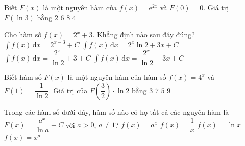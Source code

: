 \begin{ex}%
	 Biết $F(x)$ là một nguyên hàm của $f(x)=\mathrm{e}^{2x}$ và $F(0)=0$. Giá trị $F(\ln 3)$ bằng
	 \choice
		{$2$} 
		 {$6$}
		 {$8$}
		{\True $4$} 
\end{ex}

\begin{ex}%
	Cho hàm số $f(x)=2^x+3$. Khẳng  định nào sau đây đúng?
	\choice 
		 {$\displaystyle\int f(x)\mathrm{\,d}x=2^{x-3}+C$}
		{$\displaystyle\int f(x)\mathrm{\,d}x=2^x \ln  2+3x+C$}
		 {$\displaystyle\int f(x)\mathrm{\,d}x=\dfrac{2^x}{\ln 2}+3+C$}
		{\True $\displaystyle\int  f(x)\mathrm{\,d}x=\dfrac{2^x}{\ln 2}+3x+C$}
\end{ex}

\begin{ex}%
	Biết hàm số $F(x)$ là một nguyên hàm của hàm số $f(x)=4^x$ và $F(1)=\dfrac{1}{\ln 2}$. Giá trị của  $F\left(\dfrac{3}{2}\right) \cdot \ln 2$ bằng
	\choice 
		 {\True $3$}
		 {$7$}
		{$5$} 
		 {$9$}
\end{ex}

\begin{ex}%
	Trong các hàm số dưới đây, hàm số nào  có họ tất cả các nguyên hàm là $F(x)=\dfrac{a^x}{\ln a}+C$ với $a>0$, $a\ne 1$?
	 \choice
		 {\True $f(x)=a^x$}
		{$f(x)=\dfrac{1}{x}$} 
		{$f(x)=\ln  x$}
		{$f(x)=x^a$} 
\end{ex}

